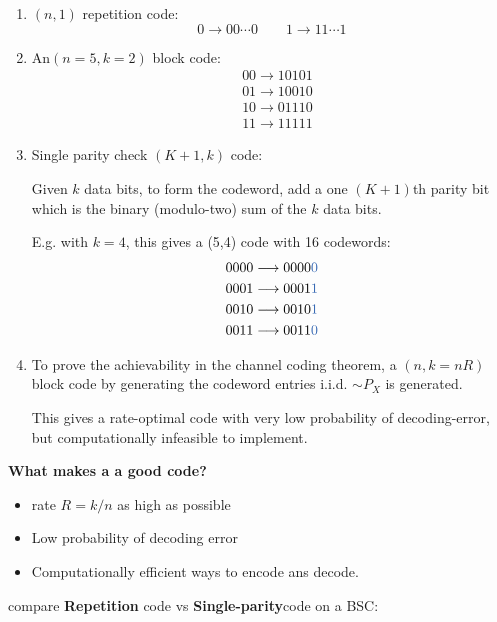 \documentclass[12pt]{article}
\begin{document}
\begin{enumerate}[label=\arabic*)]
    \item $(n,1)$ repetition code:
    \[
    0\longrightarrow 00\cdots0 \qquad 1\longrightarrow11\cdots1
    \]
    \item An$(n=5,k=2)$ block code:
    \begin{align*}
        &00 \longrightarrow 10101 \\
        &01 \longrightarrow 10010 \\
        &10 \longrightarrow 01110 \\
        &11 \longrightarrow 11111
    \end{align*}
    \item Single parity check $(K+1,k)$ code:
    
    Given $k$ data bits, to form the codeword, add a one $(K+1)$th parity bit which is the binary (modulo-two) sum of the $k$ data bits.
    
    E.g. with $k=4$, this gives a (5,4) code with 16 codewords:
    \begin{align*}
        &0000 \longrightarrow 0000\textcolor{blue1}{0}  \\
        &0001 \longrightarrow 0001\textcolor{blue1}{1}  \\
        &0010 \longrightarrow 0010\textcolor{blue1}{1}  \\
        &0011 \longrightarrow 0011\textcolor{blue1}{0}  
    \end{align*}
    \item To prove the achievability in the channel coding theorem, a $(n,k=nR)$ block code by generating the codeword entries i.i.d. $\sim P_X$ is generated.
    
    This gives a rate-optimal code with very low probability of decoding-error, but computationally infeasible to implement.
\end{enumerate}
\textbf{What makes a a good code?}
\begin{itemize}
    \item rate $R=k/n$ as high as possible
    \item Low probability of decoding error
    \item Computationally efficient ways to encode ans decode.
\end{itemize}
compare \textbf{Repetition} code vs \textbf{Single-parity}code on a BSC:
\end{document}
